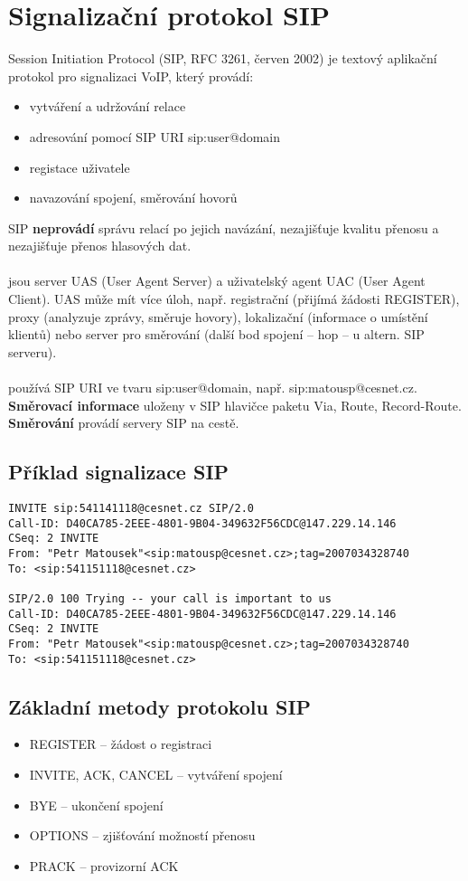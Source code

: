 
\section{Signalizační protokol SIP}
\label{sip}
Session Initiation Protocol (SIP, RFC 3261, červen 2002) je textový aplikační protokol pro signalizaci VoIP, který provádí:
\begin{itemize}
    \item vytváření a udržování relace
    \item adresování pomocí SIP URI sip:user@domain
    \item registace uživatele
    \item navazování spojení, směrování hovorů
\end{itemize}

\noindent SIP {\bf neprovádí} správu relací po jejich navázání, nezajišťuje kvalitu přenosu a nezajišťuje přenos hlasových dat. \\
~\\
 jsou server UAS (User Agent Server) a uživatelský agent UAC (User Agent Client). UAS může mít více úloh,
např. registrační (přijímá žádosti REGISTER), proxy (analyzuje zprávy, směruje hovory), lokalizační (informace o umístění klientů)
nebo server pro směrování (další bod spojení – hop – u altern. SIP serveru). \\
~\\
 používá SIP URI ve tvaru sip:user@domain, např. sip:matousp@cesnet.cz. {\bf Směrovací informace} uloženy v SIP
hlavičce paketu Via, Route, Record-Route. {\bf Směrování} provádí servery SIP na cestě.

\subsection*{Příklad signalizace SIP}
\begin{lstlisting}
INVITE sip:541141118@cesnet.cz SIP/2.0
Call-ID: D40CA785-2EEE-4801-9B04-349632F56CDC@147.229.14.146
CSeq: 2 INVITE
From: "Petr Matousek"<sip:matousp@cesnet.cz>;tag=2007034328740
To: <sip:541151118@cesnet.cz>

SIP/2.0 100 Trying -- your call is important to us
Call-ID: D40CA785-2EEE-4801-9B04-349632F56CDC@147.229.14.146
CSeq: 2 INVITE
From: "Petr Matousek"<sip:matousp@cesnet.cz>;tag=2007034328740
To: <sip:541151118@cesnet.cz>
\end{lstlisting}

\subsection*{Základní metody protokolu SIP}
\begin{itemize}
    \item REGISTER – žádost o registraci
    \item INVITE, ACK, CANCEL – vytváření spojení
    \item BYE – ukončení spojení
    \item OPTIONS – zjišťování možností přenosu
    \item PRACK – provizorní ACK
\end{itemize}


